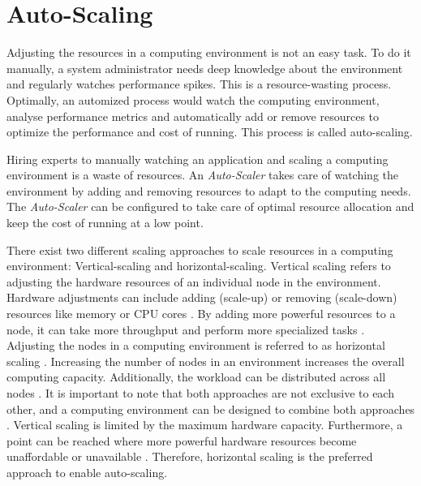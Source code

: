\section{Auto-Scaling}
Adjusting the resources in a computing environment is not an easy task. To do it manually, a system administrator needs deep knowledge about the environment and regularly watches performance spikes. This is a resource-wasting process. Optimally, an automized process would watch the computing environment, analyse performance metrics and automatically add or remove resources to optimize the performance and cost of running. This process is called auto-scaling.


Hiring experts to manually watching an application and scaling a computing environment is a waste of resources.
An \textit{Auto-Scaler} takes care of watching the environment by adding and removing resources to adapt to the computing needs. The \textit{Auto-Scaler} can be configured to take care of optimal resource allocation and keep the cost of running at a low point.


There exist two different scaling approaches to scale resources in a computing environment: Vertical-scaling and horizontal-scaling.
Vertical scaling refers to adjusting the hardware resources of an individual node in the environment. Hardware adjustments can include adding (scale-up) or removing (scale-down) resources like memory or CPU cores \cite{Wilder2012CloudPatterns}. By adding more powerful resources to a node, it can take more throughput and perform more specialized tasks \cite{Abbott2015ScalabilityArt}.
Adjusting the nodes in a computing environment is referred to as horizontal scaling \cite{Wilder2012CloudPatterns}. Increasing the number of nodes in an environment increases the overall computing capacity. Additionally, the workload can be distributed across all nodes \cite{Wilder2012CloudPatterns, Abbott2015ScalabilityArt}.
It is important to note that both approaches are not exclusive to each other, and a computing environment can be designed to combine both approaches \cite{Wilder2012CloudPatterns}.
Vertical scaling is limited by the maximum hardware capacity. Furthermore, a point can be reached where more powerful hardware resources become unaffordable or unavailable \cite{Abbot2011ScalabilityRules}.  Therefore, horizontal scaling is the preferred approach to enable auto-scaling.


